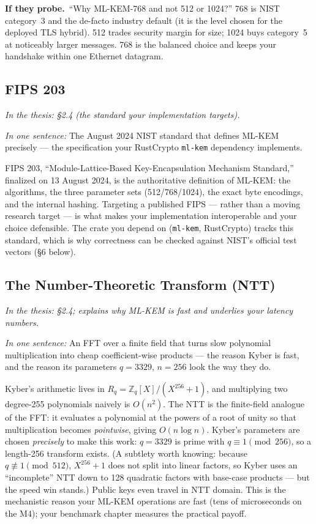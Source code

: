 \documentclass[11pt]{article}
\newcommand{\seethesis}[1]{%
  {\small\color{softgray}\textit{In the thesis: #1}}\par\vspace{3pt}}
\newcommand{\keyq}[1]{%
  \par\vspace{0.4em}%
  \noindent\colorbox{boxbg}{%
    \parbox{\dimexpr\textwidth-2\fboxsep}{%
      \small\textbf{\color{deepcyan}If they probe.}\ #1}}%
  \par\vspace{0.5em}}
\newcommand{\nutshell}[1]{\noindent\textit{In one sentence:} #1\par\vspace{4pt}}
\begin{document}
\keyq{``Why ML-KEM-768 and not 512 or 1024?'' 768 is NIST category~3 and the
de-facto industry default (it is the level chosen for the deployed TLS hybrid).
512 trades security margin for size; 1024 buys category~5 at noticeably larger
messages. 768 is the balanced choice and keeps your handshake within one Ethernet
datagram.}

\subsection{FIPS 203}
\seethesis{\S2.4 (the standard your implementation targets).}
\nutshell{The August 2024 NIST standard that defines ML-KEM precisely --- the
specification your RustCrypto \texttt{ml-kem} dependency implements.}

FIPS 203, ``Module-Lattice-Based Key-Encapsulation Mechanism Standard,''
finalized on 13 August 2024, is the authoritative definition of ML-KEM: the
algorithms, the three parameter sets (512/768/1024), the exact byte encodings,
and the internal hashing. Targeting a published FIPS --- rather than a moving
research target --- is what makes your implementation interoperable and your
choice defensible. The crate you depend on (\texttt{ml-kem}, RustCrypto) tracks
this standard, which is why correctness can be checked against NIST's official
test vectors (\S6 below).

\subsection{The Number-Theoretic Transform (NTT)}
\seethesis{\S2.4; explains why ML-KEM is fast and underlies your latency numbers.}
\nutshell{An FFT over a finite field that turns slow polynomial multiplication
into cheap coefficient-wise products --- the reason Kyber is fast, and the reason
its parameters $q=3329$, $n=256$ look the way they do.}

Kyber's arithmetic lives in $R_q = \mathbb{Z}_q[X]/(X^{256}+1)$, and multiplying
two degree-255 polynomials naively is $O(n^2)$. The NTT is the finite-field
analogue of the FFT: it evaluates a polynomial at the powers of a root of unity
so that multiplication becomes \emph{pointwise}, giving $O(n\log n)$. Kyber's
parameters are chosen \emph{precisely} to make this work: $q = 3329$ is prime
with $q \equiv 1 \pmod{256}$, so a length-256 transform exists. (A subtlety worth
knowing: because $q \not\equiv 1 \pmod{512}$, $X^{256}+1$ does not split into
linear factors, so Kyber uses an ``incomplete'' NTT down to 128 quadratic factors
with base-case products --- but the speed win stands.) Public keys even travel in
NTT domain. This is the mechanistic reason your ML-KEM operations are fast (tens
of microseconds on the M4); your benchmark chapter measures the practical payoff.
\end{document}
